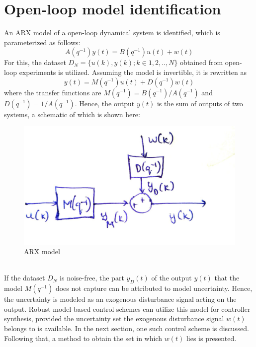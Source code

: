 \documentclass[letterpaper, 10 pt, conference]{ieeeconf}  %
\begin{document}
\section{Open-loop model identification}
An ARX model of a open-loop dynamical system is identified, which is parameterized as follows:
\begin{equation*} 
A(q^{-1})y(t)=B(q^{-1})u(t)+w(t)
\end{equation*}
For this, the dataset $D_N=\{u(k),y(k);k\in1,2,..,N\}$ obtained from open-loop experiments is utilized. Assuming the model is invertible, it is rewritten as
\begin{equation} 
y(t)=M(q^{-1})u(t)+D(q^{-1})w(t)
\label{tfmodel}
\end{equation}
where the transfer functions are $M(q^{-1})=B(q^{-1})/A(q^{-1})$ and $D(q^{-1})=1/A(q^{-1})$. Hence, the output $y(t)$ is the sum of outputs of two systems, a schematic of which is shown here:
\begin{figure}[h]
	\hspace{20pt}
	\includegraphics[scale=0.15]{schematic.jpeg}
	\caption{ARX model}
\end{figure} \\
If the dataset $D_N$ is noise-free, the part $y_D(t)$ of the output $y(t)$ that the model $M(q^{-1})$ does not capture can be attributed to model uncertainty. Hence, the uncertainty is modeled as an exogenous disturbance signal acting on the output. Robust model-based control schemes can utilize this model for controller synthesis, provided the uncertainty set the exogenous disturbance signal $w(t)$ belongs to is available. In the next section, one such control scheme is discussed. Following that, a method to obtain the set in which $w(t)$ lies is presented.
\end{document}
